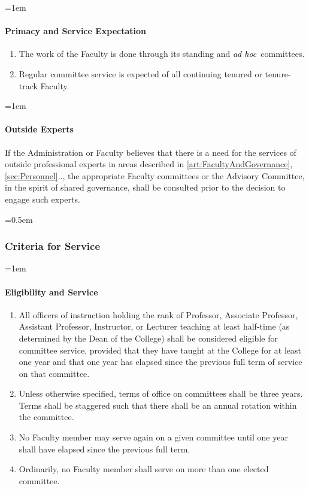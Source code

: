 \documentclass{manual}
\newcommand{\keyword}[1]{\textcolor{black}{#1}}
\newcommand{\adho}{\keyword{\textit{ad hoc}}~}
\let\oldsubsubsection\subsubsection
\renewcommand\subsubsection{\leftskip=0.5em\oldsubsubsection}
\let\oldparagraph\paragraph
\renewcommand\paragraph{\leftskip=1em\oldparagraph}
\newcommand{\itemLevelA}{\alph*.}
\newcommand{\itemRefA}{\alph*}
\begin{document}
\paragraph{Primacy and Service Expectation}

\begin{enumerate}[label=\itemLevelA,ref=\itemRefA]

\item The work of the Faculty is done through its standing and \adho committees.


\item Regular committee service is expected of all continuing tenured or tenure-track Faculty.
\end{enumerate}


\paragraph{Outside Experts}
If the Administration or Faculty believes that there is a need for the services of outside professional experts in areas described in \cref{art:FacultyAndGovernance}, \cref{sec:Personnel}.., the appropriate Faculty committees or the Advisory Committee, in the spirit of shared governance, shall be consulted prior to the decision to engage such experts.


\subsubsection{Criteria for Service}
\paragraph{Eligibility and Service}

\begin{enumerate}[label=\itemLevelA,ref=\itemRefA]

\item All officers of instruction holding the rank of Professor, Associate Professor, Assistant Professor, Instructor, or Lecturer teaching at least half-time (as determined by the Dean of the College) shall be considered eligible for committee service, provided that they have taught at the College for at least one year and that one year has elapsed since the previous full term of service on that committee.


\item Unless otherwise specified, terms of office on committees shall be three years. Terms shall be staggered such that there shall be an annual rotation within the committee.


\item No Faculty member may serve again on a given committee until one year shall have elapsed since the previous full term.


\item Ordinarily, no Faculty member shall serve on more than one elected committee.
\end{enumerate}
\end{document}
